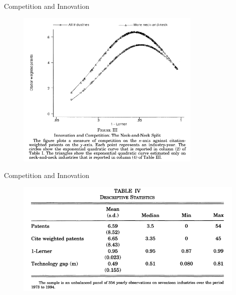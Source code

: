 \documentclass{beamer}
\begin{document}
\begin{frame}{Competition and Innovation}{}
\begin{figure}[h]
\begin{centering}
  \includegraphics[width=0.8\textwidth]{0206}
   \label{fig:0206}
\end{centering}
\end{figure}
\end{frame}

\begin{frame}{Competition and Innovation}{}
\begin{figure}[h]
\begin{centering}
  \includegraphics[width=\textwidth]{0207}
   \label{fig:0207}
\end{centering}
\end{figure}
\end{frame}
\end{document}
